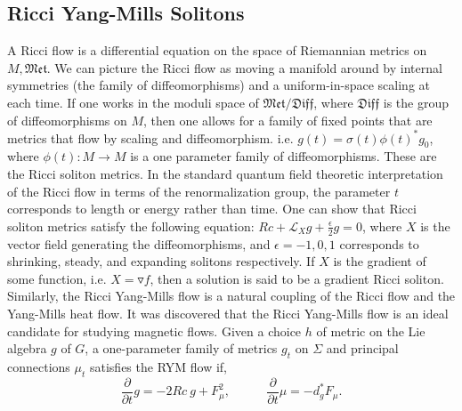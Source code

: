 \documentclass{article}
\begin{document}

    \subsection{Ricci Yang-Mills Solitons}
    
    A Ricci flow is a differential equation on the space of Riemannian metrics on $M, \mathfrak{Met}$. We can picture the Ricci flow as moving a manifold around by internal symmetries (the family of diffeomorphisms) and a uniform-in-space scaling at each time. If one works in the moduli space of $\mathfrak{Met}/ \mathfrak{Diff}$, where $\mathfrak{Diff}$ is the group of diffeomorphisms on $M$, then one allows for a family of fixed points that are metrics that flow by scaling and diffeomorphism. i.e. $g(t) = \sigma (t) \phi (t) ^* g_0$,
    where $\phi(t) :M \rightarrow M$ is a one parameter family of diffeomorphisms. 
    These are the Ricci soliton metrics. 
    In the standard quantum field theoretic interpretation of the Ricci flow in terms of the renormalization group, the parameter $t$ corresponds to length or energy rather than time.
    One can show that Ricci soliton metrics satisfy the following equation: $Rc+\mathcal{L}_X g+ 
    \frac{\epsilon}{2} g = 0$, where $X$ is the vector field generating the diffeomorphisms, and $\epsilon = -1,0,1$ corresponds to shrinking, steady, and expanding solitons respectively. If $X$ is the gradient of some function, i.e. $X=\triangledown f$, then a solution is said to be a gradient Ricci soliton. 
    Similarly, the Ricci Yang-Mills flow is a natural coupling of the Ricci flow and the Yang-Mills heat flow. It was discovered that the Ricci Yang-Mills flow is an ideal candidate for studying magnetic flows. Given a choice $h$ of metric on the Lie algebra $g$ of $G$, a one-parameter family of metrics $g_t$ on $\Sigma$ and principal connections $\mu_t$ satisfies the RYM flow if, 
    \begin{equation}
        \frac{\partial}{\partial t} g = -2 Rc \ g + F^2_\mu,  \ \ \ \ \ \ \ \ \ \ \ \ \ 
        \frac{\partial}{\partial t}\mu = -d^*_gF_\mu .
    \end{equation}
    
\end{document}
